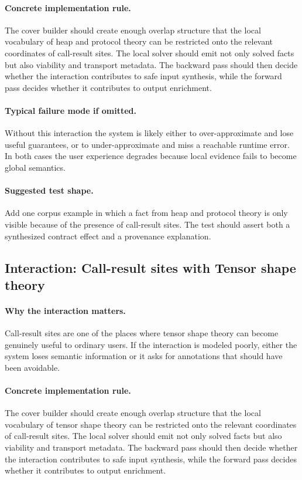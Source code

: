 \documentclass[11pt]{report}
\theoremstyle{definition}
\theoremstyle{plain}
\begin{document}
\paragraph{Concrete implementation rule.}
The cover builder should create enough overlap structure that the local
vocabulary of heap and protocol theory can be restricted onto the relevant
coordinates of call-result sites. The local solver should emit not only
solved facts but also viability and transport metadata. The backward pass
should then decide whether the interaction contributes to safe input
synthesis, while the forward pass decides whether it contributes to output
enrichment.

\paragraph{Typical failure mode if omitted.}
Without this interaction the system is likely either to over-approximate and
lose useful guarantees, or to under-approximate and miss a reachable runtime
error. In both cases the user experience degrades because local evidence
fails to become global semantics.

\paragraph{Suggested test shape.}
Add one corpus example in which a fact from heap and protocol theory is only
visible because of the presence of call-result sites. The test should
assert both a synthesized contract effect and a provenance explanation.

\subsection{Interaction: Call-result sites with Tensor shape theory}

\paragraph{Why the interaction matters.}
Call-result sites are one of the places where tensor shape theory can become
genuinely useful to ordinary users. If the interaction is modeled poorly,
either the system loses semantic information or it asks for annotations that
should have been avoidable.

\paragraph{Concrete implementation rule.}
The cover builder should create enough overlap structure that the local
vocabulary of tensor shape theory can be restricted onto the relevant
coordinates of call-result sites. The local solver should emit not only
solved facts but also viability and transport metadata. The backward pass
should then decide whether the interaction contributes to safe input
synthesis, while the forward pass decides whether it contributes to output
enrichment.
\end{document}
